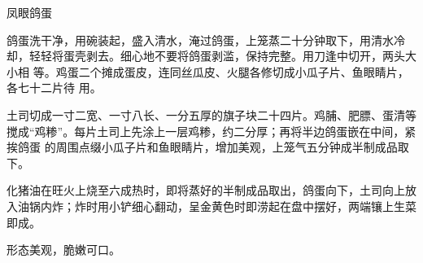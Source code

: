 %
%
%
%
%
%
%
\begin{recipe}{凤眼鸽蛋}

\ingredients


\preparation

\step 鸽蛋洗干净，用碗装起，盛入清水，淹过鸽蛋，上笼蒸二十分钟取下，用清水冷
却，轻轻将蛋壳剥去。细心地不要将鸽蛋剥滥，保持完整。用刀逢中切开，两头大小相
等。鸡蛋二个摊成蛋皮，连同丝瓜皮、火腿各修切成小瓜子片、鱼眼睛片，各七十二片待
用。

\step 土司切成一寸二宽、一寸八长、一分五厚的旗子块二十四片。鸡脯、肥膘、蛋清等
搅成“鸡糁”。每片土司上先涂上一层鸡糁，约二分厚；再将半边鸽蛋嵌在中间，紧挨鸽蛋
的周围点缀小瓜子片和鱼眼睛片，增加美观，上笼气五分钟成半制成品取下。

\step 化猪油在旺火上烧至六成热时，即将蒸好的半制成品取出，鸽蛋向下，土司向上放
入油锅内炸；炸时用小铲细心翻动，呈金黄色时即涝起在盘中摆好，两端镶上生菜即成。

\features

形态美观，脆嫩可口。

\end{recipe}

